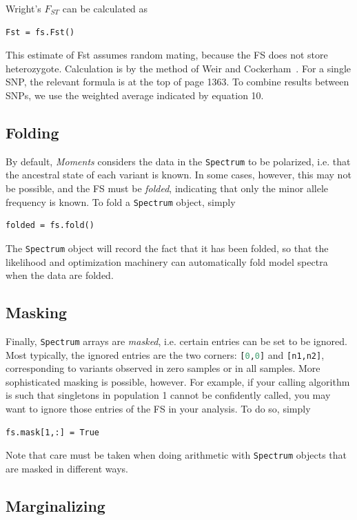 \documentclass[12pt]{article}
\makeatletter
\newcommand{\py}[1]{\lstinline[breaklines=true,language=Python, showstringspaces=False]@#1@}
\makeatother
\begin{document}
Wright's $F_{ST}$ can be calculated as
\begin{lstlisting}
Fst = fs.Fst()
\end{lstlisting}
This estimate of Fst assumes random mating, because the FS does not store heterozygote.
Calculation is by the method of Weir and Cockerham~\cite{bib:Weir1984}.
For a single SNP, the relevant formula is at the top of page 1363.
To combine results between SNPs, we use the weighted average indicated by equation 10.

\subsection{Folding}

By default, \textit{Moments} considers the data in the \py{Spectrum} to be polarized, i.e. that the ancestral state of each variant is known.
In some cases, however, this may not be possible, and the FS must be \emph{folded}, indicating that only the minor allele frequency is known.
To fold a \py{Spectrum} object, simply
\begin{lstlisting}
folded = fs.fold()
\end{lstlisting}
The \py{Spectrum} object will record the fact that it has been folded, so that the likelihood and optimization machinery can automatically fold model spectra when the data are folded.

\subsection{Masking}

Finally, \py{Spectrum} arrays are \emph{masked}, i.e. certain entries can be set to be ignored.
Most typically, the ignored entries are the two corners: \py{[0,0]} and \py{[n1,n2]}, corresponding to variants observed in zero samples or in all samples.
More sophisticated masking is possible, however.
For example, if your calling algorithm is such that singletons in population 1 cannot be confidently called, you may want to ignore those entries of the FS in your analysis.
To do so, simply
\begin{lstlisting}
fs.mask[1,:] = True
\end{lstlisting}
Note that care must be taken when doing arithmetic with \py{Spectrum} objects that are masked in different ways.

\subsection{Marginalizing}
\end{document}
